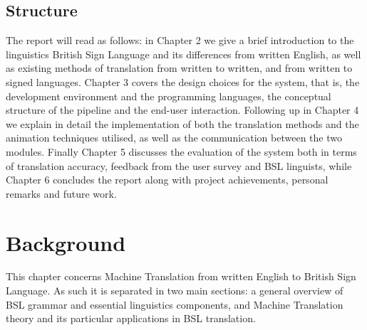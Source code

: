 \documentclass[12pt]{ociamthesis}  %
\begin{document}
\section{Structure}
The report will read as follows: in Chapter 2 we give a brief introduction to the linguistics British Sign Language and its differences from written English, as well as existing methods of translation from written to written, and from written to signed languages. Chapter 3 covers the design choices for the system, that is, the development environment and the programming languages, the conceptual structure of the pipeline and the end-user interaction. Following up in Chapter 4 we explain in detail the implementation of both the translation methods and the animation techniques utilised, as well as the communication between the two modules. Finally Chapter 5 discusses the evaluation of the system both in terms of translation accuracy, feedback from the user survey and BSL linguists, while Chapter 6 concludes the report along with project achievements, personal remarks and future work.


\chapter{Background}
This chapter concerns Machine Translation from written English to British Sign Language. As such it is separated in two main sections: a general overview of BSL grammar and essential linguistics components, and Machine Translation theory and its particular applications in BSL translation. 
\end{document}
